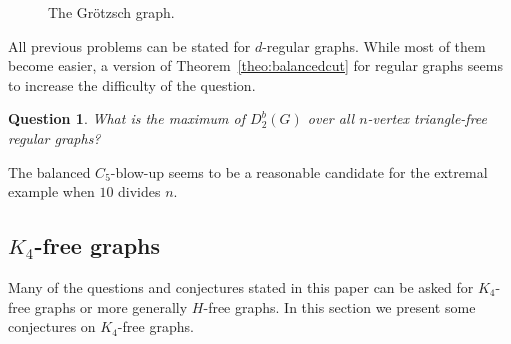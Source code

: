 \documentclass[11pt]{article}
\newtheorem{ques}[theo]{Question}
\newtheorem{conj}[theo]{Conjecture}
\theoremstyle{definition}
\numberwithin{theo}{section}
\begin{document}
\begin{figure}[h!]
\begin{center}
\end{center}
    \caption{The Gr\"otzsch graph.}
    \label{fig:grotzsch}
\end{figure}
All previous problems can be stated for $d$-regular graphs. While most of them become easier, a version of Theorem~\ref{theo:balancedcut} for regular graphs seems to increase the difficulty of the question.
\begin{ques}
What is the maximum of $D_2^b(G)$ over all $n$-vertex triangle-free regular graphs?
\end{ques}
The balanced $C_5$-blow-up seems to be a reasonable candidate for the extremal example when $10$ divides $n$.

\subsection{\texorpdfstring{$K_4$}\ -free graphs}
Many of the questions and conjectures stated in this paper can be asked for $K_4$-free graphs or more generally $H$-free graphs. In this section we present some conjectures on $K_4$-free graphs. 
\end{document}
